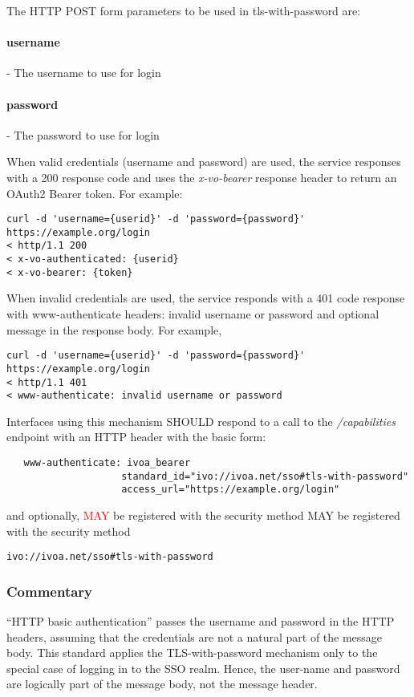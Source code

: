 \documentclass[11pt,a4paper]{ivoa}
\begin{document}
The HTTP POST form parameters to be used in tls-with-password are:
\paragraph{username} - The username to use for login
\paragraph{password} - The password to use for login

When valid credentials (username and password) are used, the service
responses with a 200 response code and uses the \emph{x-vo-bearer}
response header to return an OAuth2 Bearer token.  For example:

\begin{verbatim}
curl -d 'username={userid}' -d 'password={password}' https://example.org/login
< http/1.1 200
< x-vo-authenticated: {userid}
< x-vo-bearer: {token}
\end{verbatim}

When invalid credentials are used, the service responds with a 401 code
response with www-authenticate headers: invalid username or password
and optional message in the response body. For example,

\begin{verbatim}
curl -d 'username={userid}' -d 'password={password}' https://example.org/login
< http/1.1 401
< www-authenticate: invalid username or password
\end{verbatim}

Interfaces using this mechanism SHOULD respond to a call to the
\emph{/capabilities} endpoint with an HTTP header with the basic form:
\begin{verbatim}
   www-authenticate: ivoa_bearer
                    standard_id="ivo://ivoa.net/sso#tls-with-password"
                    access_url="https://example.org/login"
\end{verbatim}

\noindent and optionally, \textcolor{red}{MAY} be  registered with the security
method MAY be registered with the security
method

 \texttt{ivo://ivoa.net/sso\#tls-with-password}

\subsubsection{Commentary}
``HTTP basic authentication'' passes the username and password in the
HTTP headers,
assuming that the credentials are not a natural part of the message
body. This standard applies the TLS-with-password mechanism only to the
special case of logging in to the SSO realm.
Hence, the user-name and password are logically part of the message
body, not the message header.
\end{document}
